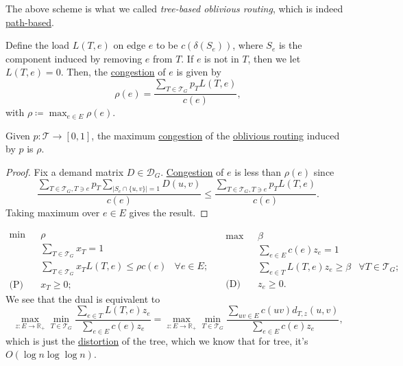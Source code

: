 \begin{notation}
	The above scheme is what we called \emph{tree-based oblivious routing}, which is indeed \hyperref[def:path-based-oblivious-routing-scheme]{path-based}.
\end{notation}

Define the load \(L(T, e)\) on edge \(e\) to be \(c(\delta (S_e))\), where \(S_e\) is the component induced by removing \(e\) from \(T\). If \(e\) is not in \(T\), then we let \(L(T, e) = 0\). Then, the \hyperref[def:congestion]{congestion} of \(e\) is given by
\[
	\rho (e)
	= \frac{\sum_{T \in \mathcal{T} _G} p_T L(T, e)}{c(e)},
\]
with \(\rho \coloneqq \max _{e \in E} \rho (e)\).

\begin{lemma}
	Given \(p \colon \mathcal{T} \to [0, 1]\), the maximum \hyperref[def:congestion]{congestion} of the \hyperref[def:oblivious-routing-scheme]{oblivious routing} induced by \(p\) is \(\rho \).
\end{lemma}
\begin{proof}
	Fix a demand matrix \(D \in \mathcal{D} _G\). \hyperref[def:congestion]{Congestion} of \(e\) is less than \(\rho (e)\) since
	\[
		\frac{\sum_{T \in \mathcal{T} _G, T \ni e} p_T \sum_{\lvert S_e \cap \{ u, v \} \rvert =1} D(u, v)}{c(e)}
		\leq \frac{\sum_{T \in \mathcal{T} _G, T \ni e} p_T L(T, e)}{c(e)}.
	\]
	Taking maximum over \(e \in E\) gives the result.
\end{proof}

\[
	\begin{aligned}
		\min~           & \rho                                                                      \\
		                & \sum_{T \in \mathcal{T} _G} x_T = 1                                       \\
		                & \sum_{T \in\mathcal{T} _G} x_T L(T, e) \leq \rho c(e) & \forall e \in E ; \\
		\text{(P)}\quad & x_T \geq 0 ;
	\end{aligned}\quad
	\begin{aligned}
		\max~           & \beta                                                                  \\
		                & \sum_{e \in E} c(e) z_e = 1                                            \\
		                & \sum_{e \in T} L(T, e) z_e \geq \beta & \forall T \in \mathcal{T} _G ; \\
		\text{(D)}\quad & z_e \geq 0 .
	\end{aligned}
\]
We see that the dual is equivalent to
\[
	\max _{z \colon E \to \mathbb{R} _+} \min _{T \in \mathcal{T} _G} \frac{\sum_{e \in T} L(T, e) z_e}{\sum_{e \in E} c(e) z_e}
	= \max _{z \colon E \to \mathbb{R} _+} \min _{T \in \mathcal{T} _G} \frac{\sum_{uv \in E} c(uv) d_{T, z}(u, v)}{\sum_{e \in E} c(e) z_e},
\]
which is just the \hyperref[def:distortion]{distortion} of the tree, which we know that for tree, it's \(O(\log n \log \log n)\).